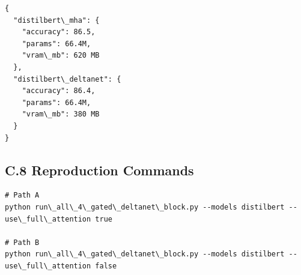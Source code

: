 \begin{lstlisting}
{
  "distilbert\_mha": {
    "accuracy": 86.5,
    "params": 66.4M,
    "vram\_mb": 620 MB
  },
  "distilbert\_deltanet": {
    "accuracy": 86.4,
    "params": 66.4M,
    "vram\_mb": 380 MB
  }
}
\end{lstlisting}

\subsection{C.8 Reproduction Commands}

\begin{lstlisting}
# Path A
python run\_all\_4\_gated\_deltanet\_block.py --models distilbert --use\_full\_attention true

# Path B
python run\_all\_4\_gated\_deltanet\_block.py --models distilbert --use\_full\_attention false
\end{lstlisting}

